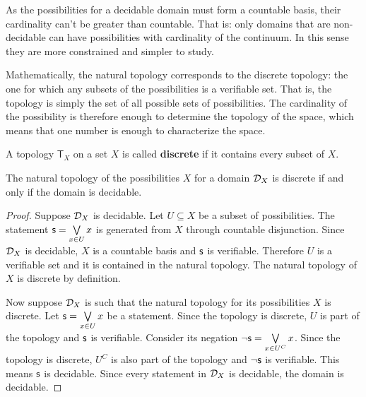 	As the possibilities for a decidable domain must form a countable basis, their cardinality can't be greater than countable. That is: only domains that are non-decidable can have possibilities with cardinality of the continuum. In this sense they are more constrained and simpler to study.
	
	Mathematically, the natural topology corresponds to the discrete topology: the one for which any subsets of the possibilities is a verifiable set. That is, the topology is simply the set of all possible sets of possibilities. The cardinality of the possibility is therefore enough to determine the topology of the space, which means that one number is enough to characterize the space.
	
	\begin{mathSection}
		\begin{defn}
			A topology $\mathsf{T}_X$ on a set $X$ is called \textbf{discrete} if it contains every subset of $X$.
		\end{defn}
		
		\begin{thrm}\label{pm-vs-decidabilityIsDiscreteness}
			The natural topology of the possibilities $X$ for a domain $\mathcal{D}_X$ is discrete if and only if the domain is decidable.
		\end{thrm}
		\begin{proof}
			Suppose $\mathcal{D}_X$ is decidable. Let $U \subseteq X$ be a subset of possibilities. The statement $\mathsf{s} = \bigvee\limits_{x \in U} x$ is generated from $X$ through countable disjunction. Since $\mathcal{D}_X$ is decidable, $X$ is a countable basis and $\mathsf{s}$ is verifiable. Therefore $U$ is a verifiable set and it is contained in the natural topology. The natural topology of $X$ is discrete by definition.
			
			Now suppose $\mathcal{D}_X$ is such that the natural topology for its possibilities $X$ is discrete. Let $\mathsf{s} = \bigvee\limits_{x \in U} x$ be a statement. Since the topology is discrete, $U$ is part of the topology and $\mathsf{s}$ is verifiable. Consider its negation $\neg\mathsf{s} = \bigvee\limits_{x \in U^C} x$. Since the topology is discrete, $U^C$ is also part of the topology and $\neg\mathsf{s}$ is verifiable. This means $\mathsf{s}$ is decidable. Since every statement in $\mathcal{D}_X$ is decidable, the domain is decidable.
		\end{proof}
		
	\end{mathSection}
	
